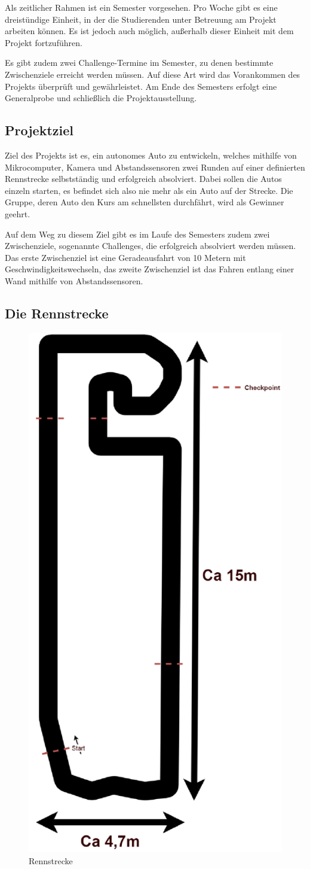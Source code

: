 \documentclass[a4paper, 12pt]{scrartcl}
\begin{document}
Als zeitlicher Rahmen ist ein Semester vorgesehen. Pro Woche gibt es eine dreistündige Einheit, in der die Studierenden unter Betreuung am Projekt arbeiten können. Es ist jedoch auch möglich, außerhalb dieser Einheit mit dem Projekt fortzuführen.

Es gibt zudem zwei Challenge-Termine im Semester, zu denen bestimmte Zwischenziele erreicht werden müssen. Auf diese Art wird das Vorankommen des Projekts überprüft und gewährleistet. Am Ende des Semesters erfolgt eine Generalprobe und schließlich die Projektausstellung.

\subsection{Projektziel}

Ziel des Projekts ist es, ein autonomes Auto zu entwickeln, welches mithilfe von Mikrocomputer, Kamera und Abstandssensoren zwei Runden auf einer definierten Rennstrecke selbstständig und erfolgreich absolviert. Dabei sollen die Autos einzeln starten, es befindet sich also nie mehr als ein Auto auf der Strecke. Die Gruppe, deren Auto den Kurs am schnellsten durchfährt, wird als Gewinner geehrt.

Auf dem Weg zu diesem Ziel gibt es im Laufe des Semesters zudem zwei Zwischenziele, sogenannte Challenges, die erfolgreich absolviert werden müssen. Das erste Zwischenziel ist eine Geradeausfahrt von 10 Metern mit Geschwindigkeitswechseln, das zweite Zwischenziel ist das Fahren entlang einer Wand mithilfe von Abstandssensoren.

\subsection{Die Rennstrecke}

\begin{figure}
	\centering
	\includegraphics[width=.3\textwidth]{Rennstrecke.png}
	\caption{Rennstrecke}
	\label{rennstrecke}
\end{figure}
\end{document}
